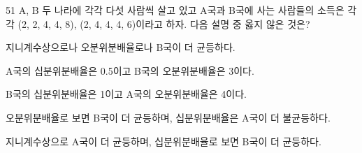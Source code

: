 \begin{question}{51}
A, B 두 나라에 각각 다섯 사람씩 살고 있고 A국과 B국에 사는 사람들의 소득은 각각 (2, 2, 4, 4, 8), (2, 4, 4, 4, 6)이라고 하자. 다음 설명 중 옳지 않은 것은?
\begin{choices}
  \item 지니계수상으로나 오분위분배율로나 B국이 더 균등하다.
  \item A국의 십분위분배율은 0.5이고 B국의 오분위분배율은 3이다.
  \item B국의 십분위분배율은 1이고 A국의 오분위분배율은 4이다.
  \item 오분위분배율로 보면 B국이 더 균등하며, 십분위분배율은 A국이 더 불균등하다.
  \item 지니계수상으로 A국이 더 균등하며, 십분위분배율로 보면 B국이 더 균등하다.
\end{choices}
\end{question}
